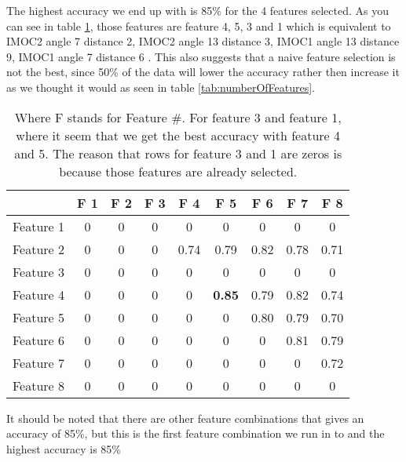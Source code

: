 The highest accuracy we end up with is 85\% for the 4 features selected. As you can see in table \ref{tab:AccuracyTable}, those features are feature 4, 5, 3 and 1 which is equivalent to IMOC2 angle 7 distance 2, IMOC2 angle 13 distance 3, IMOC1 angle 13 distance 9, IMOC1 angle 7 distance 6 . This also suggests that a naive feature selection is not the best, since 50\% of the data will lower the accuracy rather then increase it as we thought it would as seen in table \ref{tab:numberOfFeatures}.

\begin{table}[H]
  \centering
    \begin{tabular}{|c|c|c|c|c|c|c|c|c|}
    \hline
               &F 1 &F 2 &F 3 &F 4 &F 5 &F 6 &F 7 &F 8   \\ \hline
     Feature 1&        0 &        0 &        0 &        0 &        0 &        0 &        0 &        0   \\ \hline
     Feature 2&        0 &        0 &        0 &   0.74 &   0.79 &   0.82 &   0.78 &   0.71   \\ \hline
     Feature 3&        0 &        0 &        0 &        0 &        0 &        0 &        0 &       0   \\ \hline
     Feature 4&        0 &        0 &        0 &        0 &   \textbf{0.85} &   0.79 &   0.82 &  0.74   \\ \hline
     Feature 5&        0 &        0 &        0 &        0 &        0 &   0.80 &   0.79 &  0.70   \\ \hline
     Feature 6&        0 &        0 &        0 &        0 &        0 &        0 &   0.81 &   0.79   \\ \hline
     Feature 7&        0 &        0 &        0 &        0 &        0 &         0&        0 &   0.72   \\ \hline
     Feature 8&        0 &        0 &        0 &        0 &        0 &         0 &       0 &       0   \\
    \hline
    \end{tabular}%
  \caption{Where F stands for Feature \#. For feature 3 and feature 1, where it seem that we get the best accuracy with feature 4 and 5. The reason that rows for feature 3 and 1 are zeros is because those features are already selected.}\label{tab:AccuracyTable}%
\end{table}%

It should be noted that there are other feature combinations that gives an accuracy of 85\%, but this is the first feature combination we run in to and the highest accuracy is 85\%


